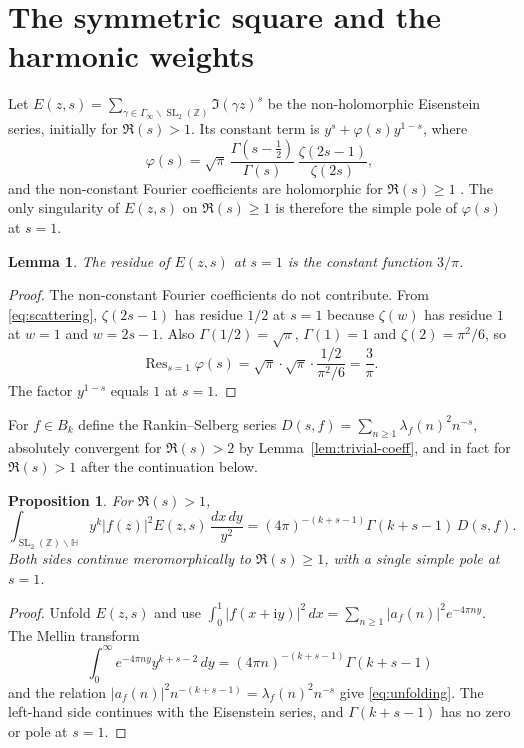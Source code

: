 \documentclass[11pt]{amsart}
\newtheorem{lemma}[theorem]{Lemma}
\newtheorem{proposition}[theorem]{Proposition}
\theoremstyle{definition}
\theoremstyle{remark}
\numberwithin{equation}{section}
\DeclareMathOperator{\SL}{SL}
\DeclareMathOperator{\Res}{Res}
\newcommand{\HH}{\mathbb{H}}
\newcommand{\ZZ}{\mathbb{Z}}
\newcommand{\ii}{\mathrm{i}}
\begin{document}
\section{The symmetric square and the harmonic weights}
\label{sec:sym}

Let $E(z,s)=\sum_{\gamma\in\Gamma_\infty\backslash\SL_2(\ZZ)}\Im(\gamma z)^s$ be the non-holomorphic Eisenstein series, initially for $\Re(s)>1$. Its constant term is $y^s+\varphi(s)y^{1-s}$, where
\begin{equation}\label{eq:scattering}
\varphi(s)
=\sqrt\pi\,\frac{\Gamma(s-\tfrac12)}{\Gamma(s)}\,\frac{\zeta(2s-1)}{\zeta(2s)},
\end{equation}
and the non-constant Fourier coefficients are holomorphic for $\Re(s)\ge 1$ \cite[Chapter~3]{Iwaniec1997}. The only singularity of $E(z,s)$ on $\Re(s)\ge 1$ is therefore the simple pole of $\varphi(s)$ at $s=1$.

\begin{lemma}\label{lem:residue-E}
The residue of $E(z,s)$ at $s=1$ is the constant function $3/\pi$.
\end{lemma}

\begin{proof}
The non-constant Fourier coefficients do not contribute. From \eqref{eq:scattering}, $\zeta(2s-1)$ has residue $1/2$ at $s=1$ because $\zeta(w)$ has residue $1$ at $w=1$ and $w=2s-1$. Also $\Gamma(1/2)=\sqrt\pi$, $\Gamma(1)=1$ and $\zeta(2)=\pi^2/6$, so
\[
\Res_{s=1}\varphi(s)
=\sqrt\pi\cdot\sqrt\pi\cdot\frac{1/2}{\pi^2/6}
=\frac{3}{\pi}.
\]
The factor $y^{1-s}$ equals $1$ at $s=1$.
\end{proof}

For $f\in B_k$ define the Rankin--Selberg series $D(s,f)=\sum_{n\ge 1}\lambda_f(n)^2 n^{-s}$, absolutely convergent for $\Re(s)>2$ by Lemma~\ref{lem:trivial-coeff}, and in fact for $\Re(s)>1$ after the continuation below.

\begin{proposition}\label{prop:unfolding}
For $\Re(s)>1$,
\begin{equation}\label{eq:unfolding}
\int_{\SL_2(\ZZ)\backslash\HH}y^k\lvert f(z)\rvert^2 E(z,s)\,\frac{dx\,dy}{y^2}
=(4\pi)^{-(k+s-1)}\Gamma(k+s-1)\,D(s,f).
\end{equation}
Both sides continue meromorphically to $\Re(s)\ge 1$, with a single simple pole at $s=1$.
\end{proposition}

\begin{proof}
Unfold $E(z,s)$ and use $\int_0^1\lvert f(x+\ii y)\rvert^2\,dx=\sum_{n\ge 1}\lvert a_f(n)\rvert^2 e^{-4\pi n y}$. The Mellin transform
\[
\int_0^\infty e^{-4\pi n y}y^{k+s-2}\,dy=(4\pi n)^{-(k+s-1)}\Gamma(k+s-1)
\]
and the relation $\lvert a_f(n)\rvert^2 n^{-(k+s-1)}=\lambda_f(n)^2 n^{-s}$ give \eqref{eq:unfolding}. The left-hand side continues with the Eisenstein series, and $\Gamma(k+s-1)$ has no zero or pole at $s=1$.
\end{proof}
\end{document}
